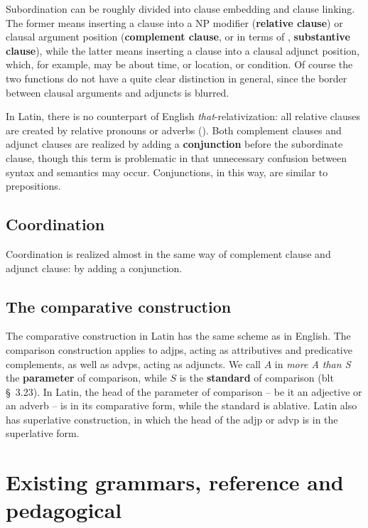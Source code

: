 \documentclass{article}
\newcommand*{\citesec}[1]{\S~{#1}}
\newcommand*{\concept}[1]{\textbf{#1}}
\newcommand*{\corpus}[1]{\emph{#1}}
\begin{document}
Subordination can be roughly divided into clause embedding and clause linking.
The former means inserting a clause into a NP modifier (\concept{relative clause})
or clausal argument position 
(\concept{complement clause}, or in terms of \citep{allen1903allen}, \concept{substantive clause}),
while the latter means inserting a clause into a clausal adjunct position,
which, for example, may be about time, or location, or condition.
Of course the two functions do not have a quite clear distinction in general,
since the border between clausal arguments and adjuncts is blurred.

In Latin, there is no counterpart of English \corpus{that}-relativization:
all relative clauses are created by relative pronouns or adverbs ().
Both complement clauses and adjunct clauses are realized 
by adding a \concept{conjunction} before the subordinate clause,
though this term is problematic in that unnecessary confusion between syntax and semantics may occur.
Conjunctions, in this way, are similar to prepositions.

\subsection{Coordination}\label{sec:coordination-abs}

Coordination is realized almost in the same way of complement clause and adjunct clause:
by adding a conjunction.

\subsection{The comparative construction}\label{sec:compare-abs}

The comparative construction in Latin has the same scheme as in English.
The comparison construction applies to \ac{adjp}s, 
acting as attributives and predicative complements,
as well as \ac{advp}s,
acting as adjuncts.
We call $A$ in \corpus{more A than S} the \concept{parameter} of comparison,
while $S$ is the \concept{standard} of comparison (\ac{blt} \citesec{3.23}).
In Latin, the head of the parameter of comparison -- be it an adjective or an adverb -- 
is in its comparative form,
while the standard is ablative.
Latin also has superlative construction, 
in which the head of the \ac{adjp} or \ac{advp} is in the superlative form.

\section{Existing grammars, reference and pedagogical}
\end{document}
